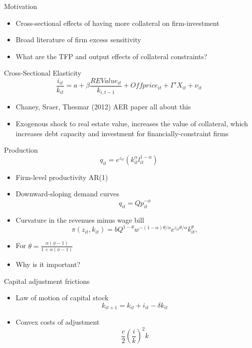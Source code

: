 \documentclass[english,xcolor=svgnames,aspectratio=169]{beamer}
\begin{document}
\begin{frame}{Motivation}
\begin{itemize}
\item Cross-sectional effects of having more collateral on firm-investment
\item Broad literature of firm excess sensitivity
\item What are the TFP and output effects of collateral constraints?
\end{itemize}
\end{frame}

\begin{frame}{Cross-Sectional Elasticity}
\[ \frac{i_{it}}{k_{it}} = a + \beta \frac{REValue_{it}}{k_{i,t-1}} + Offprice_{it} + \Gamma' X_{it} + \nu_{it}\]
\begin{itemize}
\item Chaney, Sraer, Thesmar (2012) AER paper all about this
\item Exogenous shock to real estate value, increases the value of collateral, which increases debt capacity and investment for financially-constraint firms
\end{itemize}
\end{frame}

\begin{frame}{Production}
\[q_{it} = e^{z_{it}} \left(k_{it}^{\alpha} l_{it}^{1-\alpha}\right)\]
\begin{itemize}
\item Firm-level productivity AR(1)
\item Downward-sloping demand curves
\[q_{it} = Q p_{it}^{-\phi}\]
\item Curvature in the revenues minus wage bill
\[\pi(z_{it},k_{it}) = bQ^{1-\theta} w^{-(1-\alpha)\theta/\alpha} e^{z_{it} \theta/\alpha} k_{it}^{\theta}, \]
\item For $\theta = \frac{\alpha(\phi-1)}{1+\alpha(\phi-1)}$
\item Why is it important?
\end{itemize}
\end{frame}

\begin{frame}{Capital adjustment frictions}
\begin{itemize}
\item Law of motion of capital stock
\[k_{it+1} = k_{it} + i_{it} -\delta k_{it} \]
\item Convex costs of adjustment
\[\frac{c}{2} \left(\frac{i}{k}\right)^2 k \]
\end{itemize}
\end{frame}
\end{document}
